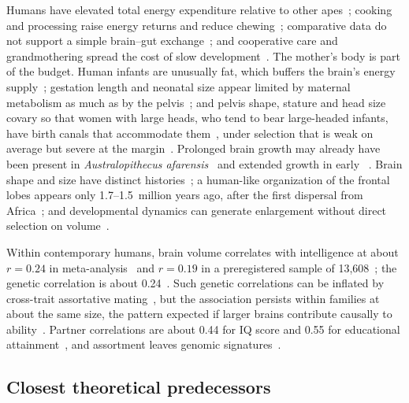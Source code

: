 Humans have elevated total energy expenditure relative to other apes~\cite{pontzer2016}; cooking and processing raise energy
returns and reduce chewing~\cite{carmody2011,zink2016}; comparative data do not support a simple brain--gut
exchange~\cite{navarrete2011}; and cooperative care and grandmothering spread the cost of slow
development~\cite{hawkes1998,burkart2014}. The mother's body is part of the budget. Human infants are unusually fat, which
buffers the brain's energy supply~\cite{kuzawa1998,cunnane2003}; gestation length and neonatal size appear limited by maternal
metabolism as much as by the pelvis~\cite{dunsworth2012}; and pelvis shape, stature and head size covary so that women with
large heads, who tend to bear large-headed infants, have birth canals that accommodate them~\cite{fischer2015}, under selection
that is weak on average but severe at the margin~\cite{mitteroecker2016}. Prolonged brain growth may already have been present
in \textit{Australopithecus afarensis}~\cite{gunz2020} and extended growth in early \Homo~\cite{zollikofer2024}. Brain shape and
size have distinct histories~\cite{neubauer2018}; a human-like organization of the frontal lobes appears only 1.7--1.5~million
years ago, after the first dispersal from Africa~\cite{poncedeleon2021}; and developmental dynamics can generate enlargement
without direct selection on volume~\cite{gonzalezforero2024}.

Within contemporary humans, brain volume correlates with intelligence at about $r=0.24$ in meta-analysis~\cite{pietschnig2015}
and $r=0.19$ in a preregistered sample of 13,608~\cite{nave2019}; the genetic correlation is about
0.24~\cite{jansen2020}. Such genetic correlations can be inflated by cross-trait assortative mating~\cite{border2022}, but the
association persists within families at about the same size, the pattern expected if larger brains contribute causally to
ability~\cite{lee2019}. Partner correlations are about 0.44 for IQ score and 0.55 for educational
attainment~\cite{horwitz2023}, and assortment leaves genomic signatures~\cite{robinson2017}.

\subsection{Closest theoretical predecessors}

